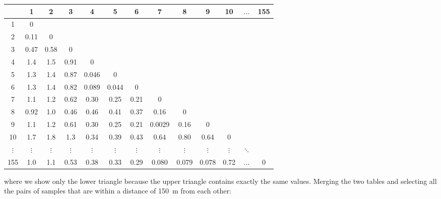 \begin{center}
\begin{tabular}{c|cccccccccccc}
~ & 1 & 2 & 3 & 4 & 5 & 6 & 7 & 8 & 9 & 10& $\ldots$ & 155\\ \hline
1 & 0 & ~ & ~ & ~ & ~ & ~ & ~ & ~ & ~ & ~ & ~ & ~ \\
2 & 0.11 & 0 & ~ & ~ & ~ & ~ & ~ & ~ & ~ & ~ & ~ & ~ \\
3 & 0.47 & 0.58 & 0 & ~ & ~ & ~ & ~ & ~ & ~ & ~ & ~ & ~ \\
4 & 1.4 & 1.5 & 0.91 & 0 & ~ & ~ & ~ & ~ & ~ & ~ & ~ & ~ \\
5 & 1.3 & 1.4 & 0.87 & 0.046 & 0 & ~ & ~ & ~ & ~ & ~ & ~ & ~ \\
6 & 1.3 & 1.4 & 0.82 & 0.089 & 0.044 & 0 & ~ & ~ & ~ & ~ & ~ & ~ \\
7 & 1.1 & 1.2 & 0.62 & 0.30 & 0.25 & 0.21 & 0 & ~ & ~ & ~ & ~ & ~ \\
8 & 0.92 & 1.0 & 0.46 & 0.46 & 0.41 & 0.37 & 0.16 & 0 & ~ & ~ & ~ & ~ \\
9 & 1.1 & 1.2 & 0.61 & 0.30 & 0.25 & 0.21 & 0.0029 & 0.16 & 0 & ~ & ~ & ~ \\
10& 1.7 & 1.8 & 1.3 & 0.34 & 0.39 & 0.43 & 0.64 & 0.80 & 0.64 & 0 & ~ & ~ \\
$\vdots$ & $\vdots$ & $\vdots$ & $\vdots$ & $\vdots$ & $\vdots$ &
$\vdots$ & $\vdots$ & $\vdots$ & $\vdots$ & $\vdots$ & $\ddots$ & ~ \\
155 & 1.0 & 1.1 & 0.53 & 0.38 & 0.33 & 0.29 & 0.080 & 0.079 & 0.078 & 0.72 & $\ldots$ & 0\\
\end{tabular}
\end{center}

\noindent where we show only the lower triangle because the upper
triangle contains exactly the same values. Merging the two tables and
selecting all the pairs of samples that are within a distance of 150~m
from each other:

